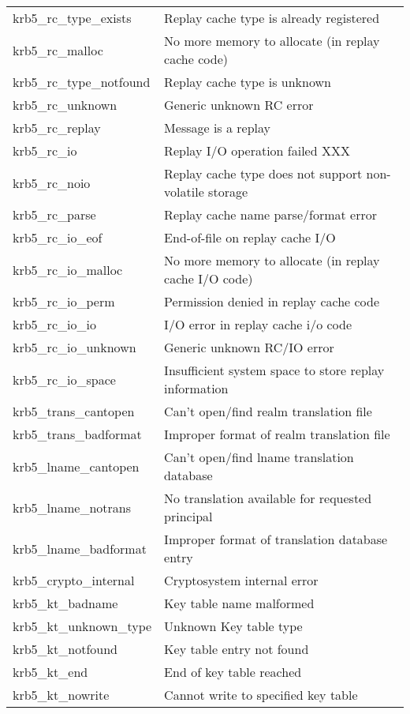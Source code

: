 \begin{small}
\begin{tabular}{ll}
{\sc krb5_rc_type_exists }&	 Replay cache type is already registered \\
{\sc krb5_rc_malloc }&	 No more memory to allocate (in replay cache code) \\
{\sc krb5_rc_type_notfound }& Replay cache type is unknown \\
{\sc krb5_rc_unknown }&	 Generic unknown RC error \\
{\sc krb5_rc_replay }&	 Message is a replay \\
{\sc krb5_rc_io }&		 Replay I/O operation failed XXX \\
{\sc krb5_rc_noio }&	 Replay cache type does not support non-volatile storage \\
{\sc krb5_rc_parse }& Replay cache name parse/format error \\
{\sc krb5_rc_io_eof }&	 End-of-file on replay cache I/O \\
{\sc krb5_rc_io_malloc }& No more memory to allocate (in replay cache I/O code)\\
{\sc krb5_rc_io_perm }&	 Permission denied in replay cache code \\
{\sc krb5_rc_io_io }&	 I/O error in replay cache i/o code \\
{\sc krb5_rc_io_unknown }&	 Generic unknown RC/IO error \\
{\sc krb5_rc_io_space }& Insufficient system space to store replay information \\
{\sc krb5_trans_cantopen }&	 Can't open/find realm translation file \\
{\sc krb5_trans_badformat }& Improper format of realm translation file \\
{\sc krb5_lname_cantopen }&	 Can't open/find lname translation database \\
{\sc krb5_lname_notrans }&	 No translation available for requested principal \\
{\sc krb5_lname_badformat }& Improper format of translation database entry \\
{\sc krb5_crypto_internal }& Cryptosystem internal error \\
{\sc krb5_kt_badname }&	 Key table name malformed \\
{\sc krb5_kt_unknown_type }& Unknown Key table type  \\
{\sc krb5_kt_notfound }&	 Key table entry not found \\
{\sc krb5_kt_end }&		 End of key table reached \\
{\sc krb5_kt_nowrite }&	 Cannot write to specified key table \\

\end{tabular}
\end{small}

